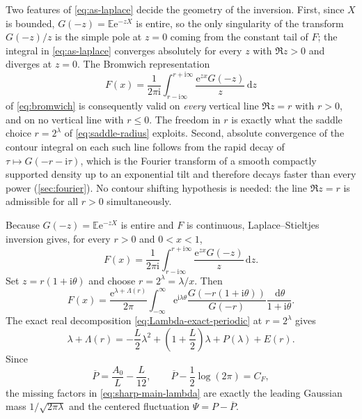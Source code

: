 \documentclass[11pt,oneside]{article}
\theoremstyle{definition}
\theoremstyle{remark}
\newcommand{\e}{\mathrm e}
\newcommand{\ii}{\mathrm i}
\newcommand{\dd}{\,\mathrm d}
\newcommand{\E}{\mathbb E}
\begin{document}
Two features of \eqref{eq:as-laplace} decide the geometry of the inversion.  First, since
$X$ is bounded, $G(-z)=\E\e^{-zX}$ is entire, so the only singularity of the transform
$G(-z)/z$ is the simple pole at $z=0$ coming from the constant tail of $F$; the integral in
\eqref{eq:as-laplace} converges absolutely for every $z$ with $\Re z>0$ and diverges at
$z=0$.  The Bromwich representation
\begin{equation*}
 F(x)=\frac1{2\pi\ii}\int_{r-\ii\infty}^{r+\ii\infty}
 \frac{\e^{zx}G(-z)}{z}\dd z
\end{equation*}
of \eqref{eq:bromwich} is consequently valid on \emph{every} vertical line $\Re z=r$ with
$r>0$, and on no vertical line with $r\le0$.  The freedom in $r$ is exactly what the saddle
choice $r=2^{\lambda}$ of \eqref{eq:saddle-radius} exploits.  Second, absolute convergence of
the contour integral on each such line follows from the rapid decay of
$\tau\mapsto G(-r-\ii\tau)$, which is the Fourier transform of a smooth compactly supported
density up to an exponential tilt and therefore decays faster than every power
(\cref{sec:fourier}).  No contour shifting hypothesis is needed: the line $\Re z=r$ is
admissible for all $r>0$ simultaneously.

Because $G(-z)=\E\e^{-zX}$ is entire and $F$ is continuous, Laplace--Stieltjes inversion
gives, for every $r>0$ and $0<x<1$,
\begin{equation}
 F(x)=\frac1{2\pi\ii}\int_{r-\ii\infty}^{r+\ii\infty}
 \frac{\e^{zx}G(-z)}{z}\dd z.                             \label{eq:bromwich}
\end{equation}
Set $z=r(1+\ii\theta)$ and choose $r=2^\lambda=\lambda/x$.  Then
\begin{equation}
 F(x)=\frac{\e^{\lambda+\Lambda(r)}}{2\pi}
 \int_{-\infty}^{\infty}
 \e^{\ii\lambda\theta}
 \frac{G(-r(1+\ii\theta))}{G(-r)}
 \frac{\dd\theta}{1+\ii\theta}.                         \label{eq:bromwich-scaled}
\end{equation}
The exact real decomposition \eqref{eq:Lambda-exact-periodic} at $r=2^\lambda$ gives
\begin{equation}
 \lambda+\Lambda(r)
 =-\frac L2\lambda^2+
 \left(1+\frac L2\right)\lambda+P(\lambda)+E(r).          \label{eq:real-exponent-at-r}
\end{equation}
Since
\begin{equation}
 \overline P=\frac{A_0}{L}-\frac L{12},
 \qquad
 \overline P-\frac12\log(2\pi)=C_F,                      \label{eq:P-mean}
\end{equation}
the missing factors in \eqref{eq:sharp-main-lambda} are exactly the leading Gaussian mass
$1/\sqrt{2\pi\lambda}$ and the centered fluctuation $\Psi=P-\overline P$.
\end{document}
